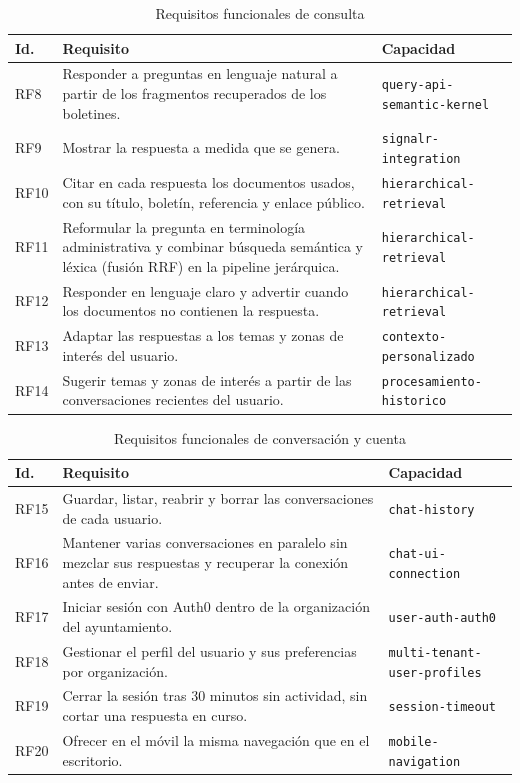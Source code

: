 \begin{table}[htbp]
\centering\small
\caption{Requisitos funcionales de consulta}
\label{tab:rf-consulta}
\begin{tabularx}{\textwidth}{@{}l X l@{}}
\toprule
\textbf{Id.} & \textbf{Requisito} & \textbf{Capacidad} \\
\midrule
RF8 & Responder a preguntas en lenguaje natural a partir de los fragmentos recuperados de los boletines. & \texttt{query-api-semantic-kernel} \\
RF9 & Mostrar la respuesta a medida que se genera. & \texttt{signalr-integration} \\
RF10 & Citar en cada respuesta los documentos usados, con su título, boletín, referencia y enlace público. & \texttt{hierarchical-retrieval} \\
RF11 & Reformular la pregunta en terminología administrativa y combinar búsqueda semántica y léxica (fusión RRF) en la pipeline jerárquica. & \texttt{hierarchical-retrieval} \\
RF12 & Responder en lenguaje claro y advertir cuando los documentos no contienen la respuesta. & \texttt{hierarchical-retrieval} \\
RF13 & Adaptar las respuestas a los temas y zonas de interés del usuario. & \texttt{contexto-personalizado} \\
RF14 & Sugerir temas y zonas de interés a partir de las conversaciones recientes del usuario. & \texttt{procesamiento-historico} \\
\bottomrule
\end{tabularx}
\end{table}
\begin{table}[htbp]
\centering\small
\caption{Requisitos funcionales de conversación y cuenta}
\label{tab:rf-chat}
\begin{tabularx}{\textwidth}{@{}l X l@{}}
\toprule
\textbf{Id.} & \textbf{Requisito} & \textbf{Capacidad} \\
\midrule
RF15 & Guardar, listar, reabrir y borrar las conversaciones de cada usuario. & \texttt{chat-history} \\
RF16 & Mantener varias conversaciones en paralelo sin mezclar sus respuestas y recuperar la conexión antes de enviar. & \texttt{chat-ui-connection} \\
RF17 & Iniciar sesión con Auth0 dentro de la organización del ayuntamiento. & \texttt{user-auth-auth0} \\
RF18 & Gestionar el perfil del usuario y sus preferencias por organización. & \texttt{multi-tenant-user-profiles} \\
RF19 & Cerrar la sesión tras 30 minutos sin actividad, sin cortar una respuesta en curso. & \texttt{session-timeout} \\
RF20 & Ofrecer en el móvil la misma navegación que en el escritorio. & \texttt{mobile-navigation} \\
\bottomrule
\end{tabularx}
\end{table}
